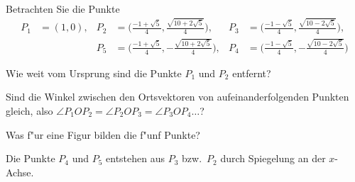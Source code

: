 Betrachten Sie die Punkte
\begin{align*}
P_1&=(1,0),
&P_2&=\biggl(\frac{-1+\sqrt{5}}4, \frac{\sqrt{10+2\sqrt{5}}}4 \biggr),
&P_3&=\biggl(\frac{-1-\sqrt{5}}4, \frac{\sqrt{10-2\sqrt{5}}}4 \biggr),\\
&&P_5&=\biggl(\frac{-1+\sqrt{5}}4,-\frac{\sqrt{10+2\sqrt{5}}}4 \biggr),
&P_4&=\biggl(\frac{-1-\sqrt{5}}4,-\frac{\sqrt{10-2\sqrt{5}}}4 \biggr)
\end{align*}
\begin{teilaufgaben}
\item Wie weit vom Ursprung sind die Punkte $P_1$ und $P_2$ 
entfernt?
\item Sind die Winkel zwischen den Ortsvektoren von aufeinanderfolgenden
Punkten gleich, also $\angle P_1OP_2=\angle P_2OP_3=\angle P_3OP_4\dots$?
\item Was f"ur eine Figur bilden die f"unf Punkte?
\end{teilaufgaben}

\begin{hinweis}
Die Punkte $P_4$ und $P_5$ entstehen aus $P_3$ bzw.~$P_2$ durch
Spiegelung an der $x$-Achse.
\end{hinweis}

